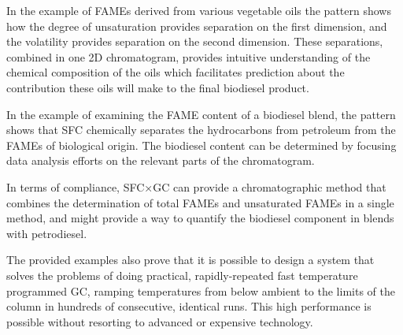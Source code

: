 In the example of FAMEs derived from various vegetable oils the pattern shows
how the degree of unsaturation provides separation on the first dimension, and
the volatility provides separation on the second dimension. These separations,
combined in one 2D chromatogram, provides intuitive understanding of the
chemical composition of the oils which facilitates prediction about the
contribution these oils will make to the final biodiesel product.

In the example of examining the FAME content of a biodiesel blend, the pattern
shows that SFC chemically separates the hydrocarbons from petroleum from the
FAMEs of biological origin. The biodiesel content can be determined by focusing
data analysis efforts on the relevant parts of the chromatogram. 

In terms of compliance, SFC×GC can provide a chromatographic method that
combines the determination of total FAMEs and unsaturated FAMEs in a single
method, and might provide a way to quantify the biodiesel component in blends
with petrodiesel.

The provided examples also prove that it is possible to design a system that
solves the problems of doing practical, rapidly-repeated fast temperature
programmed GC, ramping temperatures from below ambient to the limits of the
column in hundreds of consecutive, identical runs. This high performance is
possible without resorting to advanced or expensive technology.
